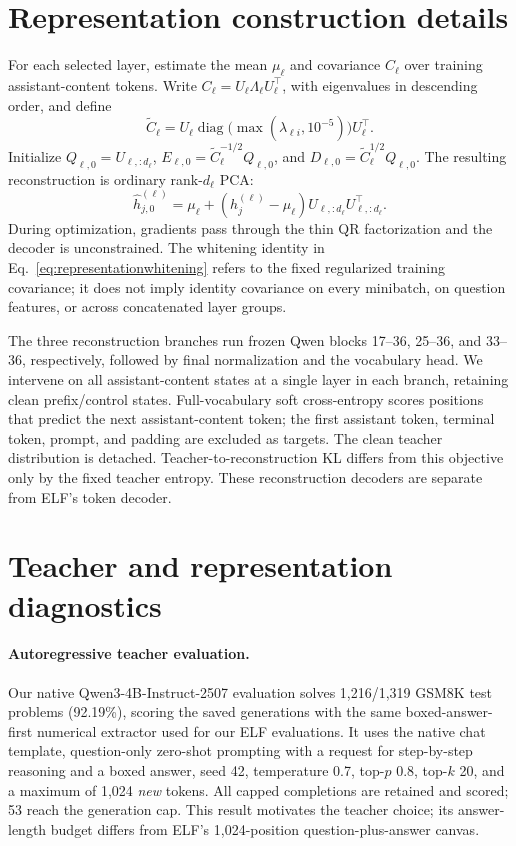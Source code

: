\section{Representation construction details}
\label{app:representationimplementation}

For each selected layer, estimate the mean $\mu_\ell$ and covariance $C_\ell$ over training assistant-content tokens. Write $C_\ell=U_\ell\Lambda_\ell U_\ell^\top$, with eigenvalues in descending order, and define
\[
 \widetilde C_\ell=U_\ell\operatorname{diag}\!\big(\max(\lambda_{\ell i},10^{-5})\big)U_\ell^\top.
\]
Initialize $Q_{\ell,0}=U_{\ell,:d_\ell}$, $E_{\ell,0}=\widetilde C_\ell^{-1/2}Q_{\ell,0}$, and $D_{\ell,0}=\widetilde C_\ell^{1/2}Q_{\ell,0}$. The resulting reconstruction is ordinary rank-$d_\ell$ PCA:
\[
 \widehat h_{j,0}^{(\ell)}=\mu_\ell+(h_j^{(\ell)}-\mu_\ell)U_{\ell,:d_\ell}U_{\ell,:d_\ell}^\top.
\]
During optimization, gradients pass through the thin QR factorization and the decoder is unconstrained. The whitening identity in Eq.~\eqref{eq:representationwhitening} refers to the fixed regularized training covariance; it does not imply identity covariance on every minibatch, on question features, or across concatenated layer groups.

The three reconstruction branches run frozen Qwen blocks 17--36, 25--36, and 33--36, respectively, followed by final normalization and the vocabulary head. We intervene on all assistant-content states at a single layer in each branch, retaining clean prefix/control states. Full-vocabulary soft cross-entropy scores positions that predict the next assistant-content token; the first assistant token, terminal token, prompt, and padding are excluded as targets. The clean teacher distribution is detached. Teacher-to-reconstruction KL differs from this objective only by the fixed teacher entropy. These reconstruction decoders are separate from ELF's token decoder.

\section{Teacher and representation diagnostics}
\label{app:representationdiagnostics}

\paragraph{Autoregressive teacher evaluation.}
Our native Qwen3-4B-Instruct-2507 evaluation solves 1,216/1,319 GSM8K test problems (92.19\%), scoring the saved generations with the same boxed-answer-first numerical extractor used for our ELF evaluations. It uses the native chat template, question-only zero-shot prompting with a request for step-by-step reasoning and a boxed answer, seed 42, temperature 0.7, top-$p$ 0.8, top-$k$ 20, and a maximum of 1,024 \emph{new} tokens. All capped completions are retained and scored; 53 reach the generation cap. This result motivates the teacher choice; its answer-length budget differs from ELF's 1,024-position question-plus-answer canvas.

